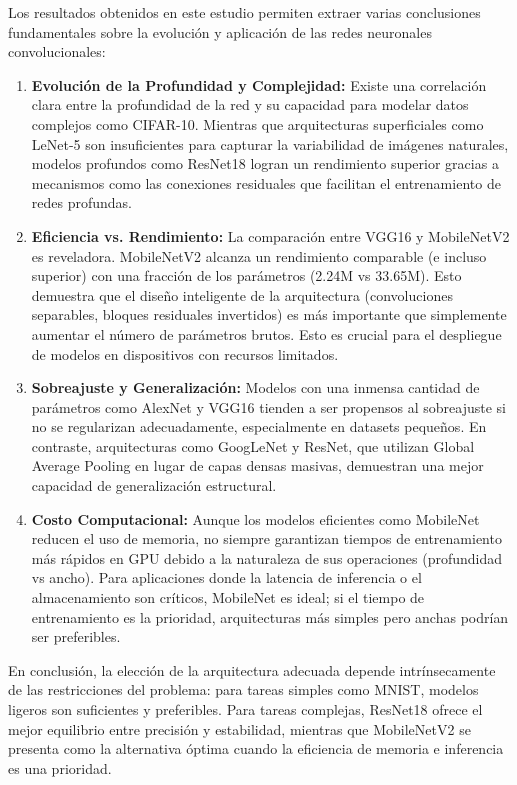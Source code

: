\documentclass{pas}
\begin{document}
Los resultados obtenidos en este estudio permiten extraer varias conclusiones fundamentales sobre la evolución y aplicación de las redes neuronales convolucionales:

\begin{enumerate}
    \item \textbf{Evolución de la Profundidad y Complejidad:} Existe una correlación clara entre la profundidad de la red y su capacidad para modelar datos complejos como CIFAR-10. Mientras que arquitecturas superficiales como LeNet-5 son insuficientes para capturar la variabilidad de imágenes naturales, modelos profundos como ResNet18 logran un rendimiento superior gracias a mecanismos como las conexiones residuales que facilitan el entrenamiento de redes profundas.
    
    \item \textbf{Eficiencia vs. Rendimiento:} La comparación entre VGG16 y MobileNetV2 es reveladora. MobileNetV2 alcanza un rendimiento comparable (e incluso superior) con una fracción de los parámetros (2.24M vs 33.65M). Esto demuestra que el diseño inteligente de la arquitectura (convoluciones separables, bloques residuales invertidos) es más importante que simplemente aumentar el número de parámetros brutos. Esto es crucial para el despliegue de modelos en dispositivos con recursos limitados.
    
    \item \textbf{Sobreajuste y Generalización:} Modelos con una inmensa cantidad de parámetros como AlexNet y VGG16 tienden a ser propensos al sobreajuste si no se regularizan adecuadamente, especialmente en datasets pequeños. En contraste, arquitecturas como GoogLeNet y ResNet, que utilizan Global Average Pooling en lugar de capas densas masivas, demuestran una mejor capacidad de generalización estructural.
    
    \item \textbf{Costo Computacional:} Aunque los modelos eficientes como MobileNet reducen el uso de memoria, no siempre garantizan tiempos de entrenamiento más rápidos en GPU debido a la naturaleza de sus operaciones (profundidad vs ancho). Para aplicaciones donde la latencia de inferencia o el almacenamiento son críticos, MobileNet es ideal; si el tiempo de entrenamiento es la prioridad, arquitecturas más simples pero anchas podrían ser preferibles.
\end{enumerate}

En conclusión, la elección de la arquitectura adecuada depende intrínsecamente de las restricciones del problema: para tareas simples como MNIST, modelos ligeros son suficientes y preferibles. Para tareas complejas, ResNet18 ofrece el mejor equilibrio entre precisión y estabilidad, mientras que MobileNetV2 se presenta como la alternativa óptima cuando la eficiencia de memoria e inferencia es una prioridad.





\end{document}
